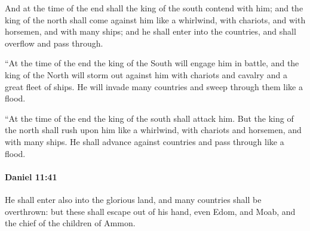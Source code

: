 			\begin{versebox}
					\item[BHS] 
					\item[LXX] 
					\item[ASV] And at the time of the end shall the king of the south contend with him; and the king of the north shall come against him like a whirlwind, with chariots, and with horsemen, and with many ships; and he shall enter into the countries, and shall overflow and pass through.
					\item[NIV] “At the time of the end the king of the South will engage him in battle, and the king of the North will storm out against him with chariots and cavalry and a great fleet of ships. He will invade many countries and sweep through them like a flood.
					\item[NRSV] “At the time of the end the king of the south shall attack him. But the king of the north shall rush upon him like a whirlwind, with chariots and horsemen, and with many ships. He shall advance against countries and pass through like a flood.
			\end{versebox}

		\paragraph{Daniel 11:41} %
			\label{DANIEL-11-41}

			He shall enter also into the glorious land, and many countries shall be overthrown: but these shall escape out of his hand, even Edom, and Moab, and the chief of the children of Ammon.

